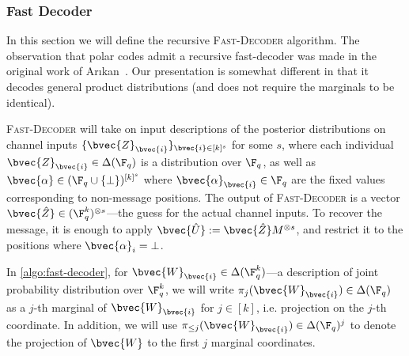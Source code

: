 \documentclass[11pt]{article}
\newcommand{\Arikan}{Ar\i kan}
\begin{document}
\subsubsection{Fast Decoder}
\label{sec:fast-decoder}
In this section we will define the recursive \textsc{Fast-Decoder} algorithm.
The observation that polar codes admit a recursive fast-decoder was made in
the original work of \Arikan~\cite{arikan-polar}. Our presentation is somewhat different in that it decodes general product distributions (and does not require the marginals to be identical). 

\textsc{Fast-Decoder}  will take on input descriptions of the posterior
distributions on channel inputs $\{\bvec{Z}_\bvec{i}\}_{\bvec{i} \in [k]^s}$ for some $s$, where each individual $\bvec{Z}_{\bvec{i}} \in \Delta(\F_q)$ is a distribution over $\F_q$, as well as $\bvec{\alpha} \in (\F_q \cup \{\bot\})^{[k]^s}$ where $\bvec{\alpha}_{\bvec{i}} \in \F_q$ 
are the fixed values corresponding to non-message positions. The output of \textsc{Fast-Decoder} is a vector $\bvec{\hat{Z}} \in (\F_q^k)^{\otimes s}$---the guess for the actual channel inputs. To recover the message, it is enough to apply $\bvec{\hat{U}} := \bvec{\hat{Z}} M^{\otimes s}$, and restrict it to the positions where $\bvec{\alpha}_i  =\bot$.


In \cref{algo:fast-decoder}, for $\bvec{W}_{\bvec{i}} \in \Delta(\F_q^k)$---a description of joint probability distribution over $\F_q^k$, we will write $\pi_j(\bvec{W}_{\bvec{i}}) \in \Delta(\F_q)$ as a $j$-th marginal of $\bvec{W}_{\bvec{i}}$ for $j\in [k]$, i.e. projection on the $j$-th coordinate. In addition, we will use $\pi_{\le j}(\bvec{W}_{\bvec{i}}) \in \Delta(\F_q)^j$ to denote the projection of $\bvec{W}$ to the first $j$ marginal coordinates.
\end{document}
